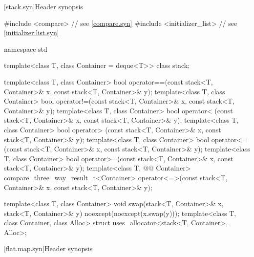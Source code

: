 [stack.syn]{Header  synopsis}

%
\begin{codeblock}
#include <compare>              // see \ref{compare.syn}
#include <initializer_list>     // see \ref{initializer.list.syn}

namespace std {
  template<class T, class Container = deque<T>> class stack;

  template<class T, class Container>
    bool operator==(const stack<T, Container>& x, const stack<T, Container>& y);
  template<class T, class Container>
    bool operator!=(const stack<T, Container>& x, const stack<T, Container>& y);
  template<class T, class Container>
    bool operator< (const stack<T, Container>& x, const stack<T, Container>& y);
  template<class T, class Container>
    bool operator> (const stack<T, Container>& x, const stack<T, Container>& y);
  template<class T, class Container>
    bool operator<=(const stack<T, Container>& x, const stack<T, Container>& y);
  template<class T, class Container>
    bool operator>=(const stack<T, Container>& x, const stack<T, Container>& y);
  template<class T, @@ Container>
    compare_three_way_result_t<Container>
      operator<=>(const stack<T, Container>& x, const stack<T, Container>& y);

  template<class T, class Container>
    void swap(stack<T, Container>& x, stack<T, Container>& y) noexcept(noexcept(x.swap(y)));
  template<class T, class Container, class Alloc>
    struct uses_allocator<stack<T, Container>, Alloc>;
}
\end{codeblock}

[flat.map.syn]{Header  synopsis}

